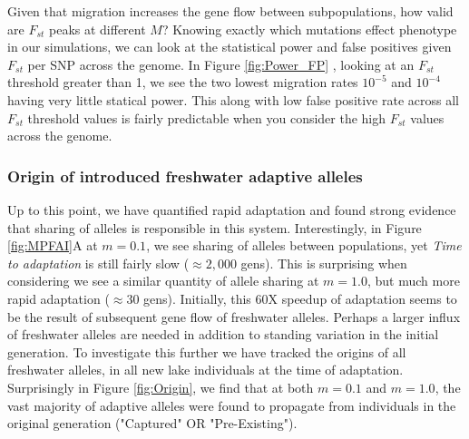 \documentclass{article}
\begin{document}
Given that migration increases the gene flow between subpopulations, how valid are $F_{st}$ peaks at different $M$?
Knowing exactly which mutations effect phenotype in our simulations, 
we can look at the statistical power and false positives given $F_{st}$ per SNP across the genome. 
In Figure \ref{fig:Power_FP} , looking at an $F_{st}$ threshold greater than 1, 
we see the two lowest migration rates $10^{-5}$ and $10^{-4}$ having very little statical power. 
This along with low false positive rate across all $F_{st}$ threshold values is fairly predictable when you consider the high $F_{st}$ values across the genome. 

\subsubsection*{Origin of introduced freshwater adaptive alleles}
Up to this point, we have quantified rapid adaptation and found strong evidence that sharing of alleles is responsible in this system.
Interestingly, in Figure \ref{fig:MPFAI}A at $m = 0.1$, we see sharing of alleles between populations,
yet \emph{Time to adaptation} is still fairly slow ($\approx 2,000$ gens).
This is surprising when considering we see a similar quantity of allele sharing at  $m = 1.0$, 
but much more rapid adaptation ($\approx 30$ gens). 
Initially, this 60X speedup of adaptation seems to be the result of subsequent gene flow of freshwater alleles. 
Perhaps a larger influx of freshwater alleles are needed in addition to standing variation in the initial generation.
To investigate this further we have tracked the origins of all freshwater alleles, in all new lake individuals at the time of adaptation. 
Surprisingly in Figure \ref{fig:Origin}, we find that at both $m = 0.1$ and $m = 1.0$,
the vast majority of adaptive alleles were found to propagate from individuals in the original generation ("Captured" OR "Pre-Existing").
\end{document}
